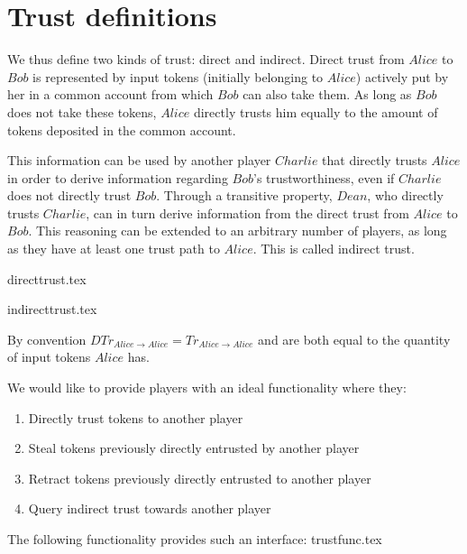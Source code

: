\section{Trust definitions}
  We thus define two kinds of trust: direct and indirect. Direct trust from $Alice$ to $Bob$ is represented by input tokens
  (initially belonging to $Alice$) actively put by her in a common account from which $Bob$ can also take them. As long as
  $Bob$ does not take these tokens, $Alice$ directly trusts him equally to the amount of tokens deposited in the common
  account.
  
  This information can be used by another player $Charlie$ that directly trusts $Alice$ in order to derive information
  regarding $Bob$'s trustworthiness, even if $Charlie$ does not directly trust $Bob$. Through a transitive property, $Dean$,
  who directly trusts $Charlie$, can in turn derive information from the direct trust from $Alice$ to $Bob$. This reasoning can
  be extended to an arbitrary number of players, as long as they have at least one trust path to $Alice$. This is called
  indirect trust.

  {directtrust.tex}

  {indirecttrust.tex}

  By convention $DTr_{Alice \rightarrow Alice} = Tr_{Alice \rightarrow Alice}$ and are both equal to the quantity of input
  tokens $Alice$ has.

  We would like to provide players with an ideal functionality where they:
  \begin{enumerate}
    \item Directly trust tokens to another player
    \item Steal tokens previously directly entrusted by another player
    \item Retract tokens previously directly entrusted to another player
    \item Query indirect trust towards another player
  \end{enumerate}
  The following functionality provides such an interface:
  {trustfunc.tex}
